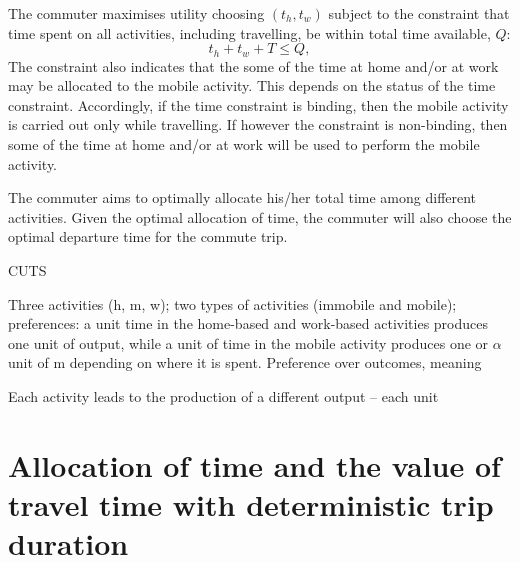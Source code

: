 \documentclass[12pt,a4paper,british]{article}
\theoremstyle{definition}
\theoremstyle{plain}
\theoremstyle{plain}
\begin{document}
The commuter maximises utility choosing $\left(t_{h},t_{w}\right)$
subject to the constraint that time spent on all activities, including
travelling, be within total time available, $Q$: 
\begin{equation}
t_{h}+t_{w}+T\leq Q,\label{constraint}
\end{equation}
The constraint also indicates that the some of the time at home and/or
at work may be allocated to the mobile activity. This depends on the
status of the time constraint. Accordingly, if the time constraint
is binding, then the mobile activity is carried out only while travelling.
If however the constraint is non-binding, then some of the time at
home and/or at work will be used to perform the mobile activity. 

The commuter aims to optimally allocate his/her total time among different
activities. Given the optimal allocation of time, the commuter will
also choose the optimal departure time for the commute trip.

CUTS

Three activities (h, m, w); two types of activities (immobile and
mobile); preferences: a unit time in the home-based and work-based
activities produces one unit of output, while a unit of time in the
mobile activity produces one or $\alpha$ unit of m depending on where
it is spent. Preference over outcomes, meaning

Each activity leads to the production of a different output -- each
unit 

\section{Allocation of time and the value of travel time with deterministic
trip duration}
\end{document}
